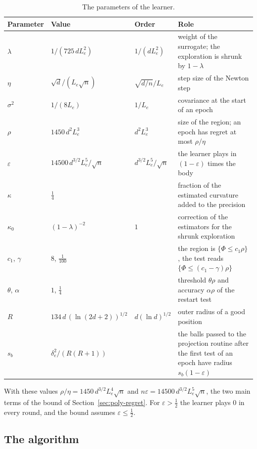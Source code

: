 \documentclass[11pt]{amsart}
\theoremstyle{definition}
\numberwithin{equation}{section}
\begin{document}
\begin{table}[ht]
\centering\small
\caption{The parameters of the learner.}\label{tab:par}
\begin{tabular}{@{}lll>{\raggedright\arraybackslash}p{}@{}}
\toprule
Parameter & Value & Order & Role\\
\midrule
$\lambda$ & $1/(725\,dL_e^2)$ & $1/(dL_e^2)$ & weight of the surrogate; the exploration is shrunk by $1-\lambda$\\
$\eta$ & $\sqrt d/(L_e\sqrt n)$ & $\sqrt{d/n}/L_e$ & step size of the Newton step\\
$\sigma^2$ & $1/(8L_e)$ & $1/L_e$ & covariance at the start of an epoch\\
$\rho$ & $1450\,d^2L_e^3$ & $d^2L_e^3$ & size of the region; an epoch has regret at most $\rho/\eta$\\
$\varepsilon$ & $14500\,d^{3/2}L_e^5/\sqrt n$ & $d^{3/2}L_e^5/\sqrt n$ & the learner plays in $(1-\varepsilon)$ times the body\\
$\kappa$ & $\frac14$ & & fraction of the estimated curvature added to the precision\\
$\kappa_0$ & $(1-\lambda)^{-2}$ & $1$ & correction of the estimators for the shrunk exploration\\
$c_1$, $\gamma$ & $8$, $\frac1{100}$ & & the region is $\{\Phi\le c_1\rho\}$, the test reads $\{\Phi\le(c_1-\gamma)\rho\}$\\
$\theta$, $\alpha$ & $1$, $\frac14$ & & threshold $\theta\rho$ and accuracy $\alpha\rho$ of the restart test\\
$R$ & $134\,d\,(\ln(2d+2))^{1/2}$ & $d(\ln d)^{1/2}$ & outer radius of a good position\\
$s_b$ & $\delta_e^2/(R(R+1))$ & & the balls passed to the projection routine after the first test of an epoch have radius $s_b(1-\varepsilon)$\\
\bottomrule
\end{tabular}
\end{table}

With these values $\rho/\eta=1450\,d^{3/2}L_e^4\sqrt n$ and $n\varepsilon=14500\,d^{3/2}L_e^5\sqrt n$, the two main terms of the bound of Section~\ref{sec:poly-regret}. For $\varepsilon>\frac12$ the learner plays $0$ in every round, and the bound assumes $\varepsilon\le\frac12$.

\subsection{The algorithm}\label{sec:poly-learner}
\end{document}
